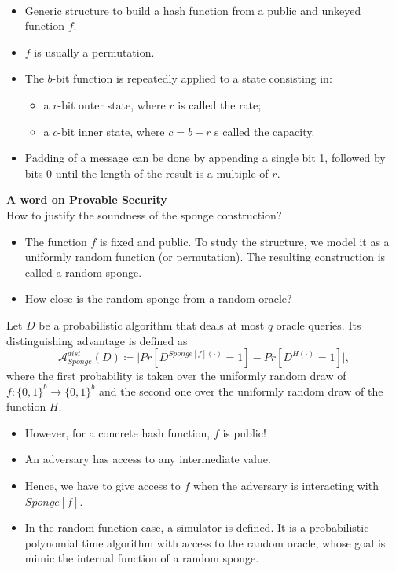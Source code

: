\begin{definition}\ 
    \begin{itemize}
        \item Generic structure to build a hash function from a public and unkeyed function $f$.
        \item $f$ is usually a permutation.
        \item The $b$-bit function is repeatedly applied to a state consisting in:
        \begin{itemize}
            \item a $r$-bit outer state, where $r$ is called the rate;
            \item a $c$-bit inner state, where $c=b-r$ s called the capacity.
        \end{itemize}
        \item Padding of a message can be done by appending a single bit 1, followed by bits 0 until the length of the result is a multiple of $r$.\newline
    \end{itemize}
\end{definition}


\textbf{A word on Provable Security}\ \\
How to justify the soundness of the sponge construction?
\begin{itemize}
    \item The function $f$ is fixed and public. To study the structure, we model it as a uniformly random function (or permutation). The resulting construction is called a random sponge.
    \item How close is the random sponge from a random oracle?
\end{itemize}

\begin{definition}
    Let $D$ be a probabilistic algorithm that deals at most $q$ oracle queries. Its distinguishing advantage is defined as
    $$\mathcal{A}_{Sponge}^{dist}(D) \coloneq \vert Pr[D^{Sponge[f](\cdot)}=1]-Pr[D^{H(\cdot)}=1] \vert,$$
    where the first probability is taken over the uniformly random draw of $f: \{0,1\}^b \to \{0,1\}^b$ and the second one over the uniformly random draw of the function $H$.
\end{definition}

\begin{itemize}
    \item However, for a concrete hash function, $f$ is public!
    \item An adversary has access to any intermediate value.
    \item Hence, we have to give access to $f$ when the adversary is interacting with $Sponge[f]$.
    \item In the random function case, a simulator is defined. It is a probabilistic polynomial time algorithm with access to the random oracle, whose goal is mimic the internal function of a random sponge.
\end{itemize}

